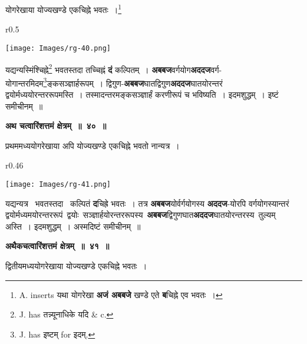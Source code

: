 \documentclass[11pt, openany]{book}
\begin{document}
{\ab योगरेखाया योज्यखण्डे एकचिह्ने भवतः~।\renewcommand{\thefootnote}{५}\footnote{{\en A. inserts} यथा योगरेखा \textbf{अजं अबबजे} खण्डे एते \textbf{ब}चिह्ने एव भवतः~।}}\\

\begin{wrapfigure}{r}{0.5\textwidth}
\vspace{-8mm}
\begin{center}
\texttt{[image: Images/rg-40.png]}
\end{center}
\vspace{-8mm}
\end{wrapfigure}

 यद्यन्यस्मिंश्चिह्ने\renewcommand{\thefootnote}{६}\footnote{{\en J. has} तन्न्यूनाधिके यदि {\en \& c.}} भवतस्तदा तच्चिह्नं \textbf{दं} कल्पितम्~। \textbf{अबबज}वर्गयोग\textbf{अददज}वर्ग-योगान्तरमिदम\renewcommand{\thefootnote}{७}\footnote{{\en J. has} इष्टम् {\en for} इदम्.}ङ्कसञ्ज्ञार्हरूपम्~। द्विगुण-\textbf{अबबज}घातद्विगुण\textbf{अददज}घातयोरन्तरं द्वयोर्मध्ययोरन्तररूपमस्ति~। तस्मादन्तरमङ्कसञ्ज्ञार्हं करणीरूपं च भविष्यति~। इदमशुद्धम्~। इष्टं समीचीनम्~॥ 
 
\newpage
\begin{center}
\textbf{\large अथ चत्वारिंशत्तमं क्षेत्रम्~॥~४०~॥}
\end{center}

{\ab प्रथममध्ययोगरेखाया अपि योज्यखण्डे एकचिह्ने भवतो नान्यत्र~। }\\

\begin{wrapfigure}{r}{0.46\textwidth}
\vspace{-8mm}
\begin{center}
\texttt{[image: Images/rg-41.png]}
\end{center}
\vspace{-8mm}
\end{wrapfigure}

 यद्यन्यत्र ~भवतस्तदा ~कल्पितं \;\textbf{द}चिह्रे भवतः~। तत्र \textbf{अबबज}योर्वर्गयोगस्य \textbf{अददज}-योरपि वर्गयोगस्यान्तरं द्वयोर्मध्यमयोरन्तररूपं \,द्वयोः \,सञ्ज्ञार्हयोरन्तररूपस्य \,\textbf{अबबज}द्विगुणघात\textbf{अददज}घातयोरन्तरस्य \,तुल्यम् अस्ति~। इदमशुद्धम्~। अस्मदिष्टं समीचीनम्~॥ 
\vspace{2mm}
 
\begin{center}
\textbf{\large अथैकचत्वारिंशत्तमं क्षेत्रम्~॥~४१~॥}
\end{center}

{\ab द्वितीयमध्ययोगरेखाया योज्यखण्डे एकचिह्ने भवतः~।}\\
\end{document}
